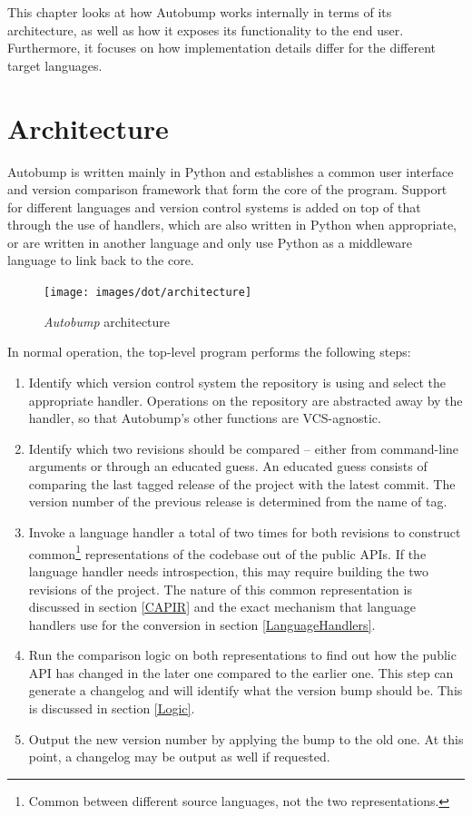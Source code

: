 \documentclass{l4proj}
\begin{document}
This chapter looks at how Autobump works internally in terms of its
architecture, as well as how it exposes its functionality to the end
user. Furthermore, it focuses on how implementation details differ for
the different target languages.

\section{Architecture}
\label{Architecture}

Autobump is written mainly in Python and establishes a common user
interface and version comparison framework that form the core of the
program. Support for different languages and version control systems
is added on top of that through the use of handlers, which are also
written in Python when appropriate, or are written in another language
and only use Python as a middleware language to link back to the core.

\begin{figure}[t]
\label{ArchitectureFig}
\centering
\texttt{[image: images/dot/architecture]}
\caption{\textit{Autobump} architecture}
\end{figure}

In normal operation, the top-level program performs the
following steps:

\begin{enumerate}
\item Identify which version control system the repository is using
and select the appropriate handler. Operations on the repository are
abstracted away by the handler, so that Autobump's other functions are
VCS-agnostic.
\item Identify which two revisions should be compared -- either from
command-line arguments or through an educated guess. An educated guess
consists of comparing the last tagged release of the project with the
latest commit. The version number of the previous release is
determined from the name of tag.
\item Invoke a language handler a total of two times for both
revisions to construct common\footnote{Common between different
source languages, not the two representations.} representations of the
codebase out of the public APIs. If the language handler needs
introspection, this may require building the two revisions of the project.
The nature of this common representation is discussed in section \ref{CAPIR}
and the exact mechanism that language handlers use for the conversion
in section \ref{LanguageHandlers}.
\item Run the comparison logic on both representations to find
out how the public API has changed in the later one compared to the
earlier one. This step can generate a changelog and will identify what
the version bump should be. This is discussed in section \ref{Logic}.
\item Output the new version number by applying the bump to the old
one. At this point, a changelog may be output as well if requested.
\end{enumerate}
\end{document}
